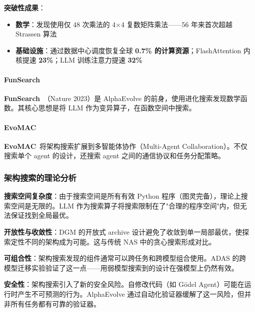 \textbf{突破性成果}：
\begin{itemize}
\item \textbf{数学}：发现使用仅 48 次乘法的 4×4 复数矩阵乘法——56 年来首次超越 Strassen 算法
\item \textbf{基础设施}：通过数据中心调度恢复全球 \textbf{0.7\% 的计算资源}；FlashAttention 内核提速 \textbf{23\%}；LLM 训练注意力提速 \textbf{32\%}
\end{itemize}

\paragraph{FunSearch}

\textbf{FunSearch}~\citep{funsearch2024}（Nature 2023）是 AlphaEvolve 的前身，使用进化搜索发现数学函数。其核心思想是将 LLM 作为变异算子，在函数空间中搜索。

\paragraph{EvoMAC}

\textbf{EvoMAC}~\citep{evomac2024}将架构搜索扩展到多智能体协作（Multi-Agent Collaboration）。不仅搜索单个 agent 的设计，还搜索 agent 之间的通信协议和任务分配策略。

\subsubsection{架构搜索的理论分析}

\textbf{搜索空间复杂度}：由于搜索空间是所有有效 Python 程序（图灵完备），理论上搜索空间是无限的。LLM 作为搜索算子将搜索限制在了"合理的程序空间"内，但无法保证找到全局最优。

\textbf{开放性与收敛性}：DGM 的开放式 archive 设计避免了收敛到单一局部最优，使探索定性不同的架构成为可能。这与传统 NAS 中的贪心搜索形成对比。

\textbf{可组合性}：架构搜索发现的组件通常可以跨任务和跨模型组合使用。ADAS 的跨模型迁移实验验证了这一点——用弱模型搜索到的设计在强模型上仍然有效。

\textbf{安全性}：架构搜索引入了新的安全风险。自修改代码（如 Gödel Agent）可能在运行时产生不可预测的行为。AlphaEvolve 通过自动化验证器缓解了这一风险，但并非所有任务都有可靠的验证器。

